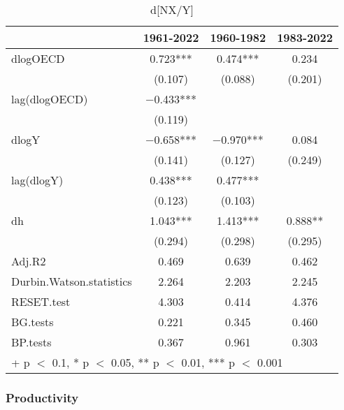 \documentclass[
  letterpaper,
  DIV=11,
  numbers=noendperiod]{scrartcl}
\begin{document}
\begin{table}
{\centering
\caption{\label{tab:tbl-NX}d[NX/Y]}
\centering
\begin{tabular}[t]{lccc}
\toprule
  & 1961-2022 & 1960-1982 & 1983-2022\\
\midrule
dlogOECD & \num{0.723}*** & \num{0.474}*** & \num{0.234}\\
 & (\num{0.107}) & (\num{0.088}) & (\num{0.201})\\
lag(dlogOECD) & \num{-0.433}*** &  & \\
 & (\num{0.119}) &  & \\
dlogY & \num{-0.658}*** & \num{-0.970}*** & \num{0.084}\\
 & (\num{0.141}) & (\num{0.127}) & (\num{0.249})\\
lag(dlogY) & \num{0.438}*** & \num{0.477}*** & \\
 & (\num{0.123}) & (\num{0.103}) & \\
dh & \num{1.043}*** & \num{1.413}*** & \num{0.888}**\\
 & (\num{0.294}) & (\num{0.298}) & (\num{0.295})\\
Adj.R2 & \num{0.469} & \num{0.639} & \num{0.462}\\
Durbin.Watson.statistics & \num{2.264} & \num{2.203} & \num{2.245}\\
RESET.test & \num{4.303} & \num{0.414} & \num{4.376}\\
BG.tests & \num{0.221} & \num{0.345} & \num{0.460}\\
BP.tests & \num{0.367} & \num{0.961} & \num{0.303}\\
\bottomrule
\multicolumn{4}{l}{\rule{0pt}{1em}+ p $<$ 0.1, * p $<$ 0.05, ** p $<$ 0.01, *** p $<$ 0.001}\\
\end{tabular}

}

\end{table}%

\subsubsection{Productivity}\label{productivity}
\end{document}
